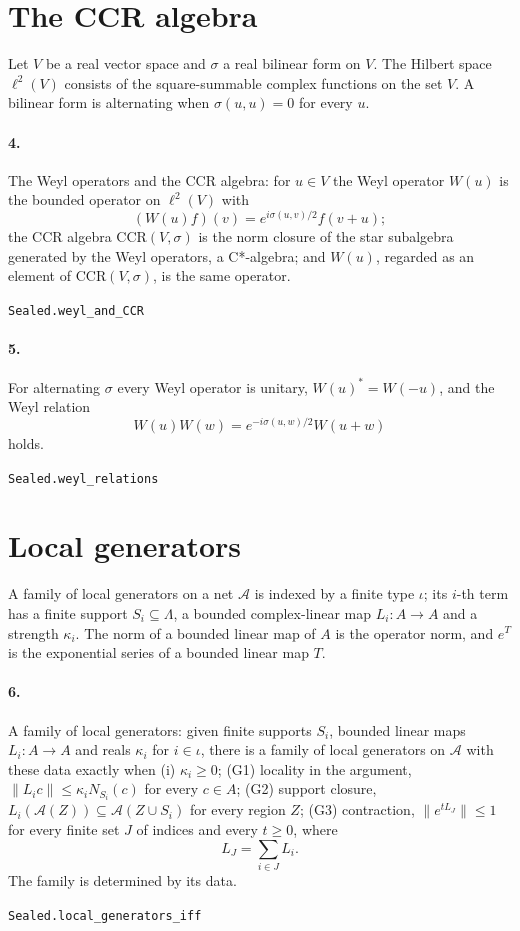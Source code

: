 \documentclass[11pt]{article}
\begin{document}
\section*{The CCR algebra}
Let $V$ be a real vector space and $\sigma$ a real bilinear form on $V$. The Hilbert space $\ell^2(V)$ consists of the square-summable complex functions on the set $V$. A bilinear form is alternating when $\sigma(u, u) = 0$ for every $u$.

\paragraph{4.} The Weyl operators and the CCR algebra: for $u \in V$ the Weyl operator $W(u)$ is the bounded operator on $\ell^2(V)$ with \[(W(u) f)(v) = e^{i\sigma(u, v)/2} f(v + u);\] the CCR algebra $\mathrm{CCR}(V, \sigma)$ is the norm closure of the star subalgebra generated by the Weyl operators, a C*-algebra; and $W(u)$, regarded as an element of $\mathrm{CCR}(V, \sigma)$, is the same operator.\par{\footnotesize\texttt{Sealed.weyl\_and\_CCR}}

\paragraph{5.} For alternating $\sigma$ every Weyl operator is unitary, $W(u)^* = W(-u)$, and the Weyl relation \[W(u) W(w) = e^{-i\sigma(u, w)/2} W(u + w)\] holds.\par{\footnotesize\texttt{Sealed.weyl\_relations}}

\section*{Local generators}
A family of local generators on a net $\mathcal A$ is indexed by a finite type $\iota$; its $i$-th term has a finite support $S_i \subseteq \Lambda$, a bounded complex-linear map $L_i : A \to A$ and a strength $\kappa_i$. The norm of a bounded linear map of $A$ is the operator norm, and $e^{T}$ is the exponential series of a bounded linear map $T$.

\paragraph{6.} A family of local generators: given finite supports $S_i$, bounded linear maps $L_i : A \to A$ and reals $\kappa_i$ for $i \in \iota$, there is a family of local generators on $\mathcal A$ with these data exactly when (i) $\kappa_i \ge 0$; (G1) locality in the argument, $\|L_i c\| \le \kappa_i N_{S_i}(c)$ for every $c \in A$; (G2) support closure, $L_i(\mathcal A(Z)) \subseteq \mathcal A(Z \cup S_i)$ for every region $Z$; (G3) contraction, $\|e^{t L_J}\| \le 1$ for every finite set $J$ of indices and every $t \ge 0$, where \[L_J = \sum_{i \in J} L_i.\] The family is determined by its data.\par{\footnotesize\texttt{Sealed.local\_generators\_iff}}
\end{document}

